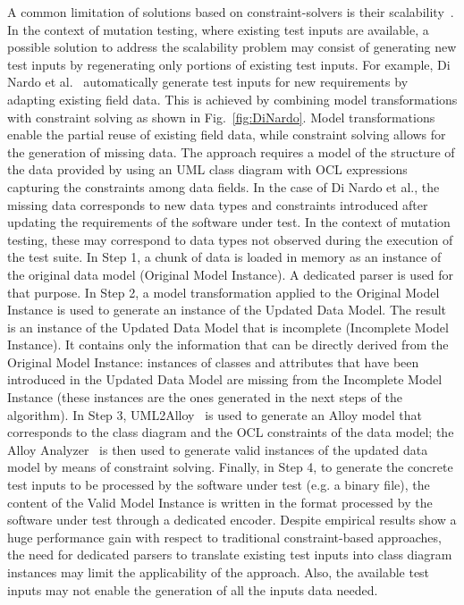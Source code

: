 A common limitation of solutions based on constraint-solvers is their scalability~\cite{di2017augmenting}. In the context of mutation testing, where existing test inputs are available, a possible solution to address the scalability problem may consist of generating new test inputs by regenerating only portions of existing test inputs.
For example, Di Nardo et al.~\cite{di2017augmenting} automatically generate test inputs for new requirements by adapting existing field data.
This is achieved by combining model transformations with constraint solving as shown in Fig.~\ref{fig:DiNardo}.
Model transformations enable the partial reuse of existing field data, while constraint solving allows for the generation of missing data. The approach requires a model of the structure of the data provided by using an UML class diagram with OCL expressions capturing the constraints among data fields. In the case of Di Nardo et al., the missing data corresponds to new data types and constraints introduced after updating the requirements of the software under test. In the context of mutation testing, these may correspond to data types not observed during the execution of the test suite.
In Step 1, a chunk of data is loaded in memory as an instance of the original data model (Original Model Instance).
A dedicated parser is used for that purpose.
In Step 2, a model transformation applied to the Original Model Instance is used to generate an instance of the Updated Data Model. The result is an instance of the Updated Data Model that is incomplete (Incomplete Model Instance).
It contains only the information that can be directly derived from the Original Model Instance:
instances of classes and attributes that have been introduced in the Updated Data Model are missing from the Incomplete Model Instance (these instances are the ones generated in the next steps of the algorithm).
In Step 3, UML2Alloy~\cite{Uml2alloy} is used to generate an Alloy model that corresponds to the class diagram and the OCL constraints of the data model; the Alloy Analyzer~\cite{AlloyWeb} is then used to generate  valid instances of the updated data model by means of constraint solving. 
Finally, in Step 4, to generate the concrete test inputs to be processed by the software under test (e.g. a binary file), the content of the Valid Model Instance is written in the format processed by the software under test through a dedicated encoder.
Despite empirical results show a huge performance gain with respect to traditional constraint-based approaches, the need for dedicated parsers to translate existing test inputs into class diagram instances may limit the applicability of the approach. Also, the available test inputs may not enable the generation of all the inputs data needed.

